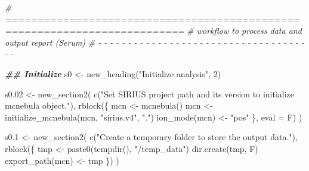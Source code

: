 \documentclass[
]{article}
\newenvironment{Shaded}{\begin{snugshade}}{\end{snugshade}}
\newcommand{\AttributeTok}[1]{\textcolor[rgb]{0.77,0.63,0.00}{#1}}
\newcommand{\CommentTok}[1]{\textcolor[rgb]{0.56,0.35,0.01}{\textit{#1}}}
\newcommand{\DecValTok}[1]{\textcolor[rgb]{0.00,0.00,0.81}{#1}}
\newcommand{\DocumentationTok}[1]{\textcolor[rgb]{0.56,0.35,0.01}{\textbf{\textit{#1}}}}
\newcommand{\FloatTok}[1]{\textcolor[rgb]{0.00,0.00,0.81}{#1}}
\newcommand{\FunctionTok}[1]{\textcolor[rgb]{0.00,0.00,0.00}{#1}}
\newcommand{\NormalTok}[1]{#1}
\newcommand{\OtherTok}[1]{\textcolor[rgb]{0.56,0.35,0.01}{#1}}
\newcommand{\StringTok}[1]{\textcolor[rgb]{0.31,0.60,0.02}{#1}}
\begin{document}
\begin{Shaded}
\begin{Highlighting}[]
\CommentTok{\# ==========================================================================}
\CommentTok{\# workflow to process data and output report (Serum)}
\CommentTok{\# {-} {-} {-} {-} {-} {-} {-} {-} {-} {-} {-} {-} {-} {-} {-} {-} {-} {-} {-} {-} {-} {-} {-} {-} {-} {-} {-} {-} {-} {-} {-} {-} {-} {-} {-} {-} {-}}

\DocumentationTok{\#\# Initialize}
\NormalTok{s0 }\OtherTok{\textless{}{-}} \FunctionTok{new\_heading}\NormalTok{(}\StringTok{"Initialize analysis"}\NormalTok{, }\DecValTok{2}\NormalTok{)}

\NormalTok{s0}\FloatTok{.02} \OtherTok{\textless{}{-}} \FunctionTok{new\_section2}\NormalTok{(}
  \FunctionTok{c}\NormalTok{(}\StringTok{"Set SIRIUS project path and its version to initialize mcnebula object."}\NormalTok{),}
  \FunctionTok{rblock}\NormalTok{(\{}
\NormalTok{    mcn }\OtherTok{\textless{}{-}} \FunctionTok{mcnebula}\NormalTok{()}
\NormalTok{    mcn }\OtherTok{\textless{}{-}} \FunctionTok{initialize\_mcnebula}\NormalTok{(mcn, }\StringTok{"sirius.v4"}\NormalTok{, }\StringTok{"."}\NormalTok{)}
    \FunctionTok{ion\_mode}\NormalTok{(mcn) }\OtherTok{\textless{}{-}} \StringTok{"pos"}
\NormalTok{  \}, }\AttributeTok{eval =}\NormalTok{ F)}
\NormalTok{)}

\NormalTok{s0}\FloatTok{.1} \OtherTok{\textless{}{-}} \FunctionTok{new\_section2}\NormalTok{(}
  \FunctionTok{c}\NormalTok{(}\StringTok{"Create a temporary folder to store the output data."}\NormalTok{),}
  \FunctionTok{rblock}\NormalTok{(\{}
\NormalTok{    tmp }\OtherTok{\textless{}{-}} \FunctionTok{paste0}\NormalTok{(}\FunctionTok{tempdir}\NormalTok{(), }\StringTok{"/temp\_data"}\NormalTok{)}
    \FunctionTok{dir.create}\NormalTok{(tmp, F)}
    \FunctionTok{export\_path}\NormalTok{(mcn) }\OtherTok{\textless{}{-}}\NormalTok{ tmp}
\NormalTok{  \})}
\NormalTok{)}


\end{Highlighting}
\end{Shaded}
\end{document}

